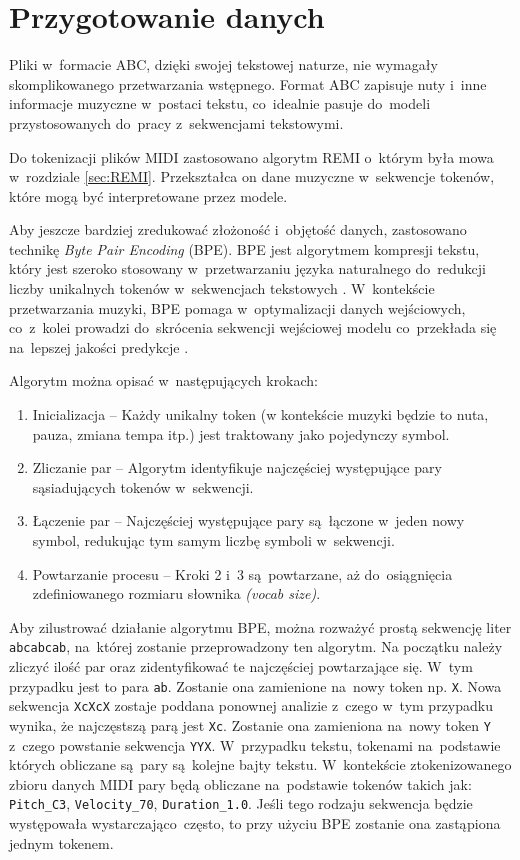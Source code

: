 \documentclass[data-science]{agh-wi} %
\begin{document}
\section{Przygotowanie danych}
Pliki w~formacie ABC, dzięki swojej tekstowej naturze, nie wymagały skomplikowanego przetwarzania wstępnego. Format ABC zapisuje nuty i~inne informacje muzyczne w~postaci tekstu, co~idealnie pasuje do~modeli przystosowanych do~pracy z~sekwencjami tekstowymi.

Do tokenizacji plików MIDI zastosowano algorytm REMI o~którym była mowa w~rozdziale \ref*{sec:REMI}. Przekształca on dane muzyczne w~sekwencje tokenów, które mogą być interpretowane przez modele.

Aby jeszcze bardziej zredukować złożoność i~objętość danych, zastosowano technikę \textit{Byte Pair Encoding} (BPE). BPE jest algorytmem kompresji tekstu, który jest szeroko stosowany w~przetwarzaniu języka naturalnego do~redukcji liczby unikalnych tokenów w~sekwencjach tekstowych \cite{bpe}. W~kontekście przetwarzania muzyki, BPE pomaga w~optymalizacji danych wejściowych, co~z~kolei prowadzi do~skrócenia sekwencji wejściowej modelu co~przekłada się na~lepszej jakości predykcje \cite*{fradet2023byte}.

\noindent Algorytm można opisać w~następujących krokach:

\begin{enumerate}
    \item Inicializacja -- Każdy unikalny token (w kontekście muzyki będzie to nuta, pauza, zmiana tempa itp.) jest traktowany jako pojedynczy symbol.
    \item Zliczanie par -- Algorytm identyfikuje najczęściej występujące pary sąsiadujących tokenów w~sekwencji.
    \item Łączenie par -- Najczęściej występujące pary są~łączone w~jeden nowy symbol, redukując tym samym liczbę symboli w~sekwencji.
    \item Powtarzanie procesu -- Kroki 2 i~3 są~powtarzane, aż do~osiągnięcia zdefiniowanego rozmiaru słownika \textit{(vocab size)}.
\end{enumerate}

\noindent Aby zilustrować działanie algorytmu BPE, można rozważyć prostą sekwencję liter \texttt{abcabcab}, na~której zostanie przeprowadzony ten algorytm. Na początku należy zliczyć ilość par oraz zidentyfikować te najczęściej powtarzające się. W~tym przypadku jest to para \texttt{ab}. Zostanie ona zamienione na~nowy token np. \texttt{X}. Nowa sekwencja \texttt{XcXcX} zostaje poddana ponownej analizie z~czego w~tym przypadku wynika, że najczęstszą parą jest \texttt{Xc}. Zostanie ona zamieniona na~nowy token \texttt{Y} z~czego powstanie sekwencja \texttt{YYX}. W~przypadku tekstu, tokenami na~podstawie których obliczane są~pary są~kolejne bajty tekstu. W~kontekście ztokenizowanego zbioru danych MIDI pary będą obliczane na~podstawie tokenów takich jak: \texttt{Pitch\_C3}, \texttt{Velocity\_70}, \texttt{Duration\_1.0}. Jeśli tego rodzaju sekwencja będzie występowała wystarczająco~często, to przy użyciu BPE zostanie ona zastąpiona jednym tokenem.
\end{document}
